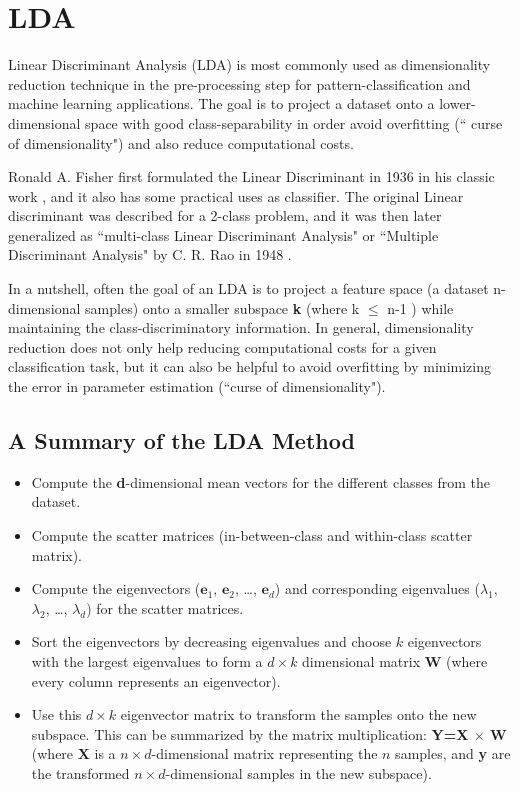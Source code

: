 \documentclass[a4paper]{article}
\begin{document}
\section{LDA}

Linear Discriminant Analysis (LDA) is most commonly used as dimensionality reduction technique in the pre-processing step for pattern-classification and machine learning applications. The goal is to project a dataset onto a lower-dimensional space with good class-separability in order avoid overfitting (`` curse of dimensionality") and also reduce computational costs.

Ronald A. Fisher first formulated the Linear Discriminant in 1936 in his classic work \cite{fisherlda},  and it also has some practical uses as classifier. The original Linear discriminant was described for a 2-class problem, and it was then later generalized as ``multi-class Linear Discriminant Analysis" or ``Multiple Discriminant Analysis" by C. R. Rao in 1948 \cite{lda1948rao}.

In a nutshell, often the goal of an LDA is to project a feature space (a dataset n-dimensional samples) onto a smaller subspace \textbf{k} (where k  $\leqslant$ n-1 ) while maintaining the class-discriminatory information. 
In general, dimensionality reduction does not only help reducing computational costs for a given classification task, but it can also be helpful to avoid overfitting by minimizing the error in parameter estimation (``curse of dimensionality").

\subsection{A Summary of the LDA Method}
\begin{itemize}
	\item Compute the \textbf{d}-dimensional mean vectors for the different classes from the dataset.
	\item Compute the scatter matrices (in-between-class and within-class scatter matrix).
	\item Compute the eigenvectors ($\textbf{e}_1$, $\textbf{e}_2$, \dots, $\textbf{e}_d$) and corresponding eigenvalues ($\lambda_1$, $\lambda_2$, \dots, $\lambda_d$) for the scatter matrices.
	\item Sort the eigenvectors by decreasing eigenvalues and choose $k$ eigenvectors with the largest eigenvalues to form a $d \times k$ dimensional matrix \textbf{W} (where every column represents an eigenvector).
	\item Use this $d \times k$ eigenvector matrix to transform the samples onto the new subspace. This can be summarized by the matrix multiplication: \textbf{Y=X $\times$ W }(where \textbf{X} is a $n \times d$-dimensional matrix representing the $n$ samples, and \textbf{y} are the transformed $n \times d$-dimensional samples in the new subspace).
\end{itemize}
\end{document}
